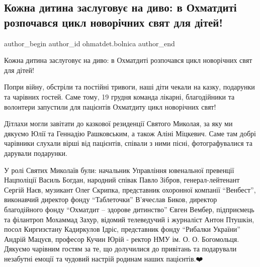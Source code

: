  
 
 
 
 
 
\subsection{Кожна дитина заслуговує на диво: в Охматдиті розпочався цикл новорічних свят для дітей!}
\label{sec:22_12_2022.fb.ohmatdet.bolnica.1.dytyna_svjato}
 
\ifcmt
 author_begin
   author_id ohmatdet.bolnica
 author_end
\fi

Кожна дитина заслуговує на диво: в Охматдиті розпочався цикл новорічних свят
для дітей!💫🎄

Попри війну, обстріли та постійні тривоги, наші діти чекали на казку, подарунки
та чарівних гостей. Саме тому, 19 грудня команда лікарні, благодійники та
волонтери запустили для пацієнтів Охматдиту цикл новорічних свят!🎊

Дітлахи могли завітати до казкової резиденції Святого Миколая, за яку ми
дякуємо Юлії та Геннадію Рашковським, а також Аліні Міцкевич. Саме там добрі
чарівники слухали вірші від пацієнтів, співали з ними пісні, фотографувалися та
дарували подарунки.🎁

У ролі Святих Миколаїв були: начальник Управління ювенальної превенції
Нацполіції Василь Богдан, народний співак Павло Зібров, генерал-лейтенант
Сергій Наєв, музикант Олег Скрипка, представник охоронної компанії \enquote{Венбест},
виконавчий директор фонду \enquote{Таблеточки} В'ячеслав Биков, директор благодійного
фонду \enquote{Охматдит – здорове дитинство} Євген Вембер, підприємець та філантроп
Мохаммад Захур, відомий телеведучий і журналіст Антон Птушкін, посол
Киргизстану Кадиркулов Ідріс, представник фонду \enquote{Рибалки України} Андрій
Мацуєв, професор Кучин Юрій - ректор НМУ ім. О. О. Богомольця. Дякуємо чарівним
гостям за те, що долучилися до привітань та подарували незабутні емоції та
чудовий настрій родинам наших пацієнтів.❤️

